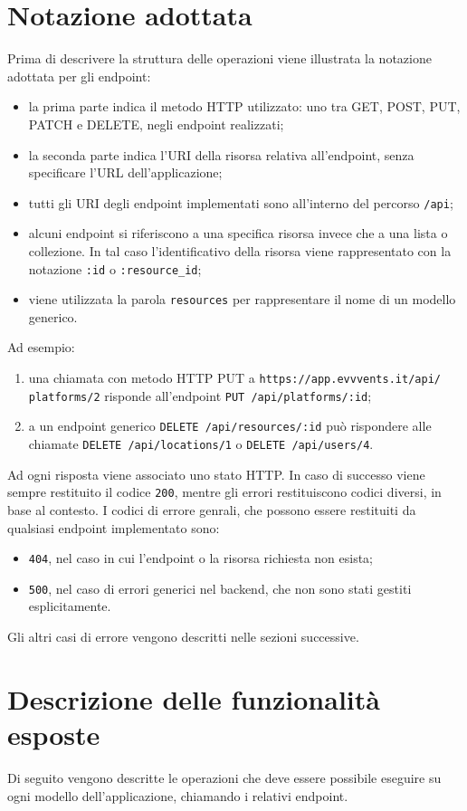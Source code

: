 \section{Notazione adottata}
Prima di descrivere la struttura delle operazioni viene illustrata la notazione adottata per gli endpoint:
\begin{itemize}
	\item la prima parte indica il metodo HTTP utilizzato: uno tra GET, POST, PUT, PATCH e DELETE, negli endpoint realizzati;
	\item la seconda parte indica l'URI della risorsa relativa all'endpoint, senza specificare l'URL dell'applicazione;
	\item tutti gli URI degli endpoint implementati sono all'interno del percorso \verb|/api|;
	\item alcuni endpoint si riferiscono a una specifica risorsa invece che a una lista o collezione. In tal caso l'identificativo della risorsa viene rappresentato con la notazione \verb|:id| o \verb|:resource_id|;
	\item viene utilizzata la parola \texttt{resources} per rappresentare il nome di un modello generico.
\end{itemize}
Ad esempio:
\begin{enumerate}
	\item una chiamata con metodo HTTP PUT a \verb|https://app.evvvents.it/api/| \\ \verb|platforms/2| risponde all'endpoint \verb|PUT /api/platforms/:id|;
	\item a un endpoint generico \verb|DELETE /api/resources/:id| può rispondere alle chiamate \verb|DELETE /api/locations/1| o \verb|DELETE /api/users/4|.
\end{enumerate}
Ad ogni risposta viene associato uno stato HTTP. In caso di successo viene sempre restituito il codice \verb|200|, mentre gli errori restituiscono codici diversi, in base al contesto. I codici di errore genrali, che possono essere restituiti da qualsiasi endpoint implementato sono:
\begin{itemize}
	\item \verb|404|, nel caso in cui l'endpoint o la risorsa richiesta non esista;
	\item \verb|500|, nel caso di errori generici nel backend, che non sono stati gestiti esplicitamente.
\end{itemize}
Gli altri casi di errore vengono descritti nelle sezioni successive.

\section{Descrizione delle funzionalità esposte}
Di seguito vengono descritte le operazioni che deve essere possibile eseguire su ogni modello dell'applicazione, chiamando i relativi endpoint.

